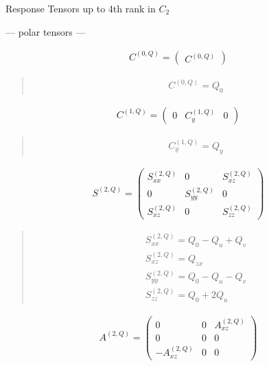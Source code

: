 \documentclass[fleqn,10pt]{jsarticle}
\begin{document}
\setcounter{MaxMatrixCols}{16}

\begin{center}
\LARGE
Response Tensors up to 4th rank in $C_{2}$
\end{center}
\begin{center}\LARGE --- polar tensors ---\end{center}
\begin{align*}
C^{(0,Q)} = \begin{pmatrix} C^{(0,Q)} \end{pmatrix}
\end{align*}
\begin{quote}
\begin{align*}
& C^{(0,Q)} = Q_{0}
\end{align*}
\end{quote}
\begin{align*}
C^{(1,Q)} = \begin{pmatrix} 0 & C^{(1,Q)}_{y} & 0 \end{pmatrix}
\end{align*}
\begin{quote}
\begin{align*}
& C^{(1,Q)}_{y} = Q_{y}
\end{align*}
\end{quote}
\begin{align*}
S^{(2,Q)} = \begin{pmatrix} S^{(2,Q)}_{xx} & 0 & S^{(2,Q)}_{xz} \\ 0 & S^{(2,Q)}_{yy} & 0 \\ S^{(2,Q)}_{xz} & 0 & S^{(2,Q)}_{zz} \end{pmatrix}
\end{align*}
\begin{quote}
\begin{align*}
& S^{(2,Q)}_{xx} = Q_{0} - Q_{u} + Q_{v} \\
& S^{(2,Q)}_{xz} = Q_{zx} \\
& S^{(2,Q)}_{yy} = Q_{0} - Q_{u} - Q_{v} \\
& S^{(2,Q)}_{zz} = Q_{0} + 2 Q_{u}
\end{align*}
\end{quote}
\begin{align*}
A^{(2,Q)} = \begin{pmatrix} 0 & 0 & A^{(2,Q)}_{xz} \\ 0 & 0 & 0 \\ - A^{(2,Q)}_{xz} & 0 & 0 \end{pmatrix}
\end{align*}
\end{document}
